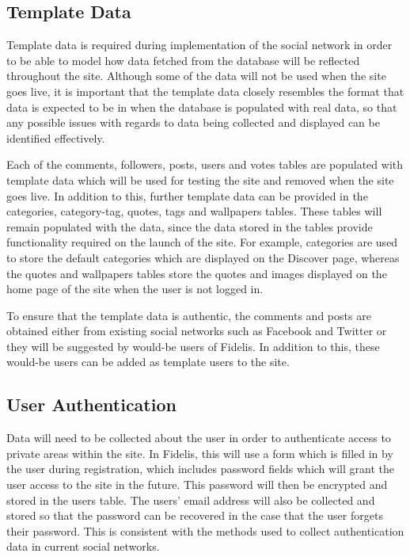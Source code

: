 \subsection{Template Data}
Template data is required during implementation of the social network in order to be able to model how data fetched from the database will be reflected throughout the site. Although some of the data will not be used when the site goes live, it is important that the template data closely resembles the format that data is expected to be in when the database is populated with real data, so that any possible issues with regards to data being collected and displayed can be identified effectively.

Each of the comments, followers, posts, users and votes tables are populated with template data which will be used for testing the site and removed when the site goes live. In addition to this, further template data can be provided in the categories, category-tag, quotes, tags and wallpapers tables. These tables will remain populated with the data, since the data stored in the tables provide functionality required on the launch of the site. For example, categories are used to store the default categories which are displayed on the Discover page, whereas the quotes and wallpapers tables store the quotes and images displayed on the home page of the site when the user is not logged in.

To ensure that the template data is authentic, the comments and posts are obtained either from existing social networks such as Facebook and Twitter or they will be suggested by would-be users of Fidelis. In addition to this, these would-be users can be added as template users to the site.

\subsection{User Authentication}
Data will need to be collected about the user in order to authenticate access to private areas within the site. In Fidelis, this will use a form which is filled in by the user during registration, which includes password fields which will grant the user access to the site in the future. This password will then be encrypted and stored in the users table. The users' email address will also be collected and stored so that the password can be recovered in the case that the user forgets their password. This is consistent with the methods used to collect authentication data in current social networks.